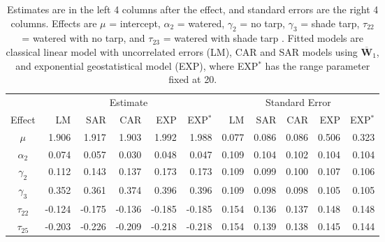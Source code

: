 \documentclass[12pt, titlepage]{article}
\begin{document}
\begin{table}[H] 
	\caption{Estimates are in the left 4 columns after the effect, and standard errors are the right 4 columns.  Effects are $\mu$ = intercept, $\alpha_{2}$ = watered, $\gamma_{2}$ = no tarp, $\gamma_{3}$ = shade tarp, $\tau_{22}$ = watered with no tarp, and $\tau_{23}$ = watered with shade tarp .  Fitted models are classical linear model with uncorrelated errors (LM), CAR and SAR models using $\overline{\mathbf{W}}_{1}$, and exponential geostatistical model (EXP), where EXP$^{*}$ has the range parameter fixed at 20. \label{tab:caribou_estse}}
\begin{center}
\begin{tabular}{|c|rrrrr|rrrrr|}
  \hline
  \hline{}
   & \multicolumn{5}{|c|}{Estimate} & \multicolumn{5}{c|}{Standard Error} \\
Effect & LM & SAR & CAR & EXP & EXP$^{*}$ & LM & SAR & CAR & EXP & EXP$^{*}$ \\
  \hline
  \hline{}
$\mu$ & 1.906 & 1.917 & 1.903 & 1.992 & 1.988 & 0.077 & 0.086 & 0.086 & 0.506 & 0.323 \\ 
$\alpha_{2}$ &  0.074 & 0.057 & 0.030 & 0.048 & 0.047 & 0.109 & 0.104 & 0.102 & 0.104 & 0.104 \\ 
$\gamma_{2}$ &   0.112 & 0.143 & 0.137 & 0.173 & 0.173 & 0.109 & 0.099 & 0.100 & 0.107 & 0.106 \\ 
$\gamma_{3}$ &   0.352 & 0.361 & 0.374 & 0.396 & 0.396 & 0.109 & 0.098 & 0.098 & 0.105 & 0.105 \\ 
$\tau_{22}$ &   -0.124 & -0.175 & -0.136 & -0.185 & -0.185 & 0.154 & 0.136 & 0.137 & 0.148 & 0.148 \\ 
$\tau_{25}$ &   -0.203 & -0.226 & -0.209 & -0.218 & -0.218 & 0.154 & 0.139 & 0.138 & 0.145 & 0.144 \\ 
  \hline
  \hline
\end{tabular}
\end{center}
\end{table}
\end{document}
